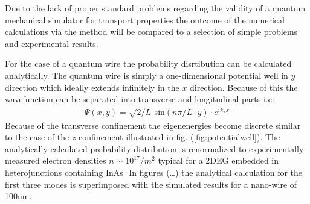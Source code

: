 Due to the lack of proper standard problems regarding the validity of a quantum mechanical simulator for transport properties the outcome of the numerical calculations via the \gfnc{} method will be compared to a selection of simple problems and experimental results.\par
For the case of a quantum wire the probability disrtibution can be calculated analytically. The quantum wire is simply a one-dimensional potential well in $y$ direction which ideally extends infinitely in the $x$ direction.
Because of this the wavefunction can be separated into transverse and longitudinal parts i.e:
\begin{align}
\Psi(x,y) = \sqrt{2/L}\text{ sin}(n\pi/L \cdot y) \cdot e^{ik_xx}
\end{align}
Because of the transverse confinement the eigenenergies become discrete similar to the case of the $z$ confinement illustrated in fig. (\ref{fig:potentialwell}).
The analytically calculated probability distribution is renormalized to experimentally measured electron densities $n \sim 10^{17}/m^2$ typical for a 2DEG embedded in heterojunctions containing InAs\,\cite{gelfand2006}\,\cite{JJAP.26.L59}
In figures (\dots ) the analytical calculation for the first three modes is superimposed with the simulated results for a nano-wire of 100nm. 

